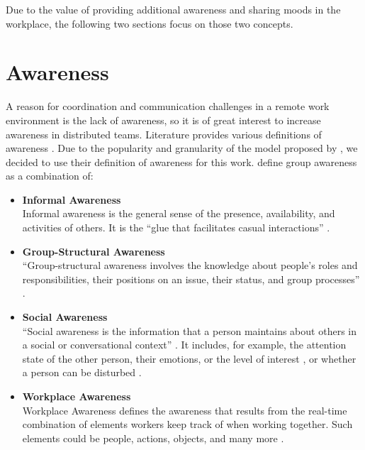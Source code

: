Due to the value of providing additional awareness and sharing moods in the workplace, the following two sections focus on those two concepts.

\section{Awareness}
\label{section:awareness}
A reason for coordination and communication challenges in a remote work environment is the lack of awareness, so it is of great interest to increase awareness in distributed teams. Literature provides various definitions of awareness \autocite{chang2007out, gross2013supporting, gross2005user}. Due to the popularity and granularity of the model proposed by \textcite{gutwin1996workspace}, we decided to use their definition of awareness for this work. \textcite{gutwin1996workspace} define group awareness as a combination of:


\begin{itemize}[itemsep=0ex, parsep=0ex, leftmargin=*]
      \item \textbf{Informal Awareness} \\
            Informal awareness is the general sense of the presence, availability, and activities of others. It is the \enquote{glue that facilitates casual interactions} \autocite[p.~6]{gutwin1996workspace}.
      \item \textbf{Group-Structural Awareness} \\
            \enquote{Group-structural awareness involves the knowledge about people’s roles and responsibilities, their positions on an issue, their status, and group processes} \autocite[p.~6]{gutwin1996workspace}.
      \item \textbf{Social Awareness} \\
            \enquote{Social awareness is the information that a person maintains about others in a social or conversational context} \autocite{gutwin1996workspace}. It includes, for example, the attention state of the other person, their emotions, or the level of interest \autocite[p.~6]{gutwin1996workspace}, or whether a person can be disturbed \autocite{gutwin1995support}.
      \item \textbf{Workplace Awareness} \\
            Workplace Awareness defines the awareness that results from the real-time combination of elements workers keep track of when working together. Such elements could be people, actions, objects, and many more \autocite{gutwin1995support}.
\end{itemize}

